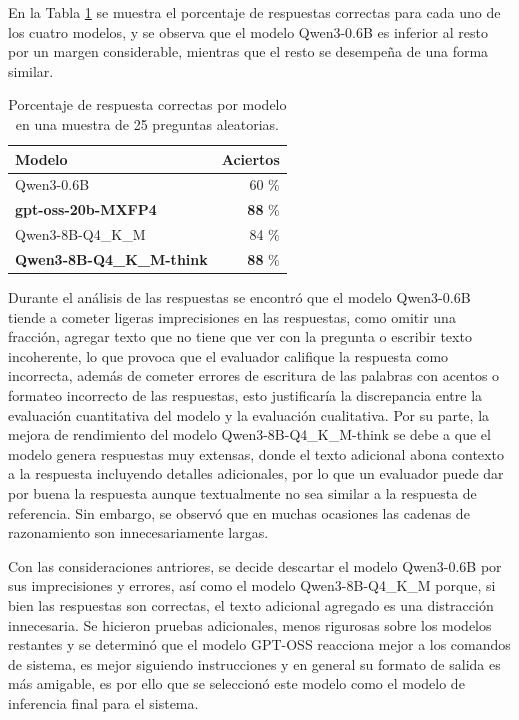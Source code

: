 En la Tabla \ref{tab:metrics_manual} se muestra el porcentaje de respuestas
correctas para cada uno de los cuatro modelos, y se observa que el modelo
Qwen3-0.6B es inferior al resto por un margen considerable, mientras que el
resto se desempeña de una forma similar.

\begin{table}[!ht]
    \centering
    \begin{tabular}{|l|r|}
        \hline
        Modelo                           & Aciertos       \\ \hline
        Qwen3-0.6B                       & 60 \%          \\ \hline
        \textbf{gpt-oss-20b-MXFP4}       & \textbf{88} \% \\ \hline
        Qwen3-8B-Q4\_K\_M                & 84 \%          \\ \hline
        \textbf{Qwen3-8B-Q4\_K\_M-think} & \textbf{88} \% \\ \hline
    \end{tabular}
    \caption{Porcentaje de respuesta correctas por modelo en una muestra de 25 preguntas aleatorias.}
    \label{tab:metrics_manual}
\end{table}

Durante el análisis de las respuestas se encontró que el modelo Qwen3-0.6B
tiende a cometer ligeras imprecisiones en las respuestas, como omitir
una fracción, agregar texto que no tiene que ver con la pregunta o escribir
texto incoherente, lo que provoca que el evaluador califique la respuesta
como incorrecta, además de cometer errores de
escritura de las palabras con acentos o formateo incorrecto de las respuestas,
esto justificaría la discrepancia entre la evaluación cuantitativa del modelo
y la evaluación cualitativa.
Por su parte, la mejora de rendimiento del modelo Qwen3-8B-Q4\_K\_M-think
se debe a que el modelo genera respuestas muy extensas, donde el texto
adicional abona contexto a la respuesta incluyendo detalles adicionales,
por lo que un evaluador puede dar por buena la respuesta aunque
textualmente no sea similar a la respuesta de referencia. Sin embargo,
se observó que en muchas ocasiones las cadenas de razonamiento son
innecesariamente largas.

Con las consideraciones antriores, se decide descartar el modelo Qwen3-0.6B por sus imprecisiones y errores,
así como el modelo Qwen3-8B-Q4\_K\_M porque, si bien las respuestas son correctas,
el texto adicional agregado es una distracción innecesaria. Se hicieron pruebas
adicionales, menos rigurosas sobre los modelos restantes y se determinó que
el modelo GPT-OSS reacciona mejor a los comandos de sistema, es mejor
siguiendo instrucciones y en general su formato de salida es más amigable,
es por ello que se seleccionó este modelo como el modelo de inferencia final
para el sistema.

